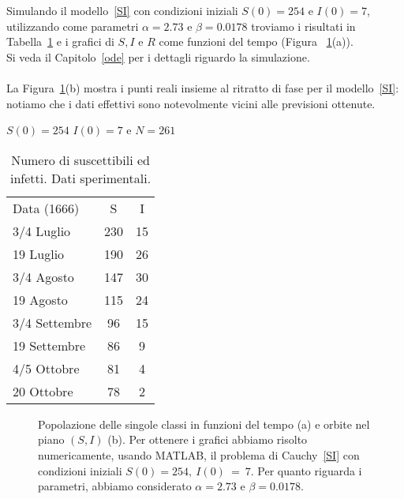 Simulando il modello~\eqref{SI} con condizioni iniziali $S(0) = 254$ e  $I(0)=7$,   utilizzando come parametri $\alpha =2.73 $ e $\beta  = 0.0178 $ troviamo i risultati in Tabella~\ref{table::3} e i grafici di $S,I$ e $R$ come funzioni del tempo (Figura~
\ref{fig::sirsemplice}(a)).\\ Si veda il Capitolo~\ref{ode} per i dettagli riguardo la simulazione.\\ \\
La Figura~\ref{fig::sirsemplice}(b) mostra i punti reali insieme al ritratto di fase per il modello~\eqref{SI}: notiamo che i  dati effettivi sono notevolmente vicini alle previsioni ottenute. \begin{table}[h]
\centering
\caption{Numero di suscettibili ed infetti. Dati sperimentali.}
$S(0) = 254$ $I(0) = 7$ e $N = 261$ \\
\label{table::3}
\begin{tabular}{l|c|c}

Data (1666) & S & I\\
\cline{1-3}
3/4 Luglio  & 230& 15\\
19 Luglio  & 190 & 26\\
3/4 Agosto  & 147& 30\\
19  Agosto  & 115& 24\\
3/4 Settembre  & 96&  15\\
19 Settembre  & 86& 9\\
4/5 Ottobre  & 81& 4\\
20 Ottobre  & 78& 2\\
 
\end{tabular}
\end{table}

\begin{figure}[h]
\centering
\subfloat[][]{
\centering
\resizebox{0.45\textwidth}{!}
{

}
}
\subfloat[][]
{
\resizebox{0.45\textwidth}{!}{
}
}
\caption[Analisi dei dati della peste di Eyam]{Popolazione delle singole classi  in funzioni del tempo (a) e orbite nel piano $(S,I)$ (b).  Per ottenere i grafici abbiamo risolto  numericamente, usando MATLAB,  il problema di Cauchy~\eqref{SI} con  condizioni iniziali $S(0)=254, ~I(0)~=~7$.  Per quanto riguarda i parametri, abbiamo considerato    $\alpha=2.73$  e $\beta= 0.0178$.}
\label{fig::sirsemplice}
\end{figure}



